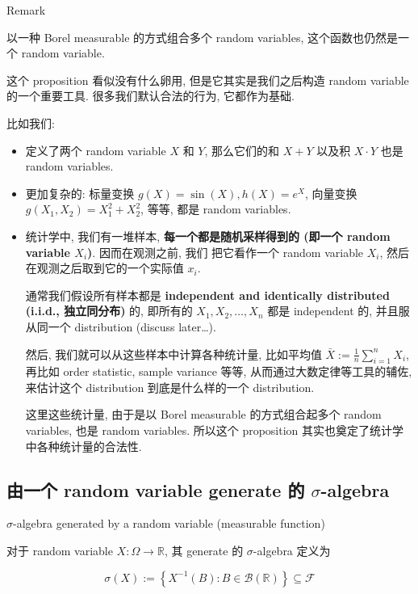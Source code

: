 \documentclass{qlnotes-export}
\begin{document}
\begin{qlremark}{Remark}

以一种 Borel measurable 的方式组合多个 random variables, 这个函数也仍然是一个 random variable.

这个 proposition 看似没有什么卵用, 但是它其实是我们之后构造 random variable 的一个重要工具. 很多我们默认合法的行为, 它都作为基础.

比如我们:

\begin{itemize}
\item
  定义了两个 random variable \(X\) 和 \(Y\), 那么它们的和 \(X + Y\) 以及积 \(X \cdot Y\) 也是 random variables.
\item
  更加复杂的: 标量变换 \(g(X) = \sin(X),h(X) = e^{X}\), 向量变换 \(g(X_{1},X_{2}) = X_{1}^{2} + X_{2}^{2}\), 等等, 都是 random variables.
\item
  统计学中, 我们有一堆样本, \textbf{每一个都是随机采样得到的 (即一个 random variable \(X_{i}\))}. 因而在观测之前, 我们 把它看作一个 random variable \(X_{i}\), 然后在观测之后取到它的一个实际值 \(x_{i}\).

  通常我们假设所有样本都是 \textbf{independent and identically distributed (i.i.d., 独立同分布)} 的, 即所有的 \(X_{1},X_{2},\ldots,X_{n}\) 都是 independent 的, 并且服从同一个 distribution (discuss later\ldots).

  然后, 我们就可以从这些样本中计算各种统计量, 比如平均值 \(\bar{X} := \frac{1}{n}\sum_{i = 1}^{n}X_{i}\), 再比如 order statistic, sample variance 等等, 从而通过大数定律等工具的辅佐, 来估计这个 distribution 到底是什么样的一个 distribution.

  这里这些统计量, 由于是以 Borel measurable 的方式组合起多个 random variables, 也是 random variables. 所以这个 proposition 其实也奠定了统计学中各种统计量的合法性.
\end{itemize}

\end{qlremark}

\subsection{\texorpdfstring{由一个 random variable generate 的 \(\sigma\)-algebra}{由一个 random variable generate 的 \textbackslash sigma-algebra}}\label{ux7531ux4e00ux4e2a-random-variable-generate-ux7684-sigma-algebra}

\begin{definition}{\(\sigma\)-algebra generated by a random variable (measurable function)}\label{def-02-random-variables-sigma-algebra-generated-by-a-random-variable-measurable-function}

对于 random variable \(X:\Omega\rightarrow{\mathbb{R}}\), 其 generate 的 \(\sigma\)-algebra 定义为

\[\sigma(X) := \left\{ {X^{- 1}(B):B \in \mathcal{B}({\mathbb{R}})} \right\} \subseteq \mathcal{F}\]

\end{definition}
\end{document}
